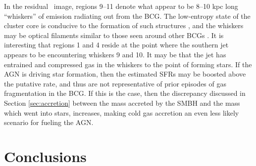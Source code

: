 \documentclass[11pt, preprint]{aastex}
\begin{document}
In the residual \myi\ image, regions 9--11 denote what appear to be
8--10 kpc long ``whiskers'' of emission radiating out from the
BCG. The low-entropy state of the cluster core is conducive to the
formation of such structures \citep{conduction}, and the whiskers may
be optical filaments similar to those seen around other BCGs
\citep[\eg][]{2003MNRAS.344L..48F}. It is interesting that regions 1
and 4 reside at the point where the southern jet appears to be
encountering whiskers 9 and 10. It may be that the jet has entrained
and compressed gas in the whiskers to the point of forming stars. If
the AGN is driving star formation, then the estimated SFRs may be
boosted above the putative rate, and thus are not representative of
prior episodes of gas fragmentation in the BCG. If this is the case,
then the discrepancy discussed in Section \ref{sec:accretion} between
the mass accreted by the SMBH and the mass which went into stars,
increases, making cold gas accretion an even less likely scenario for
fueling the AGN.

\section{Conclusions}
\label{sec:con}
\end{document}
